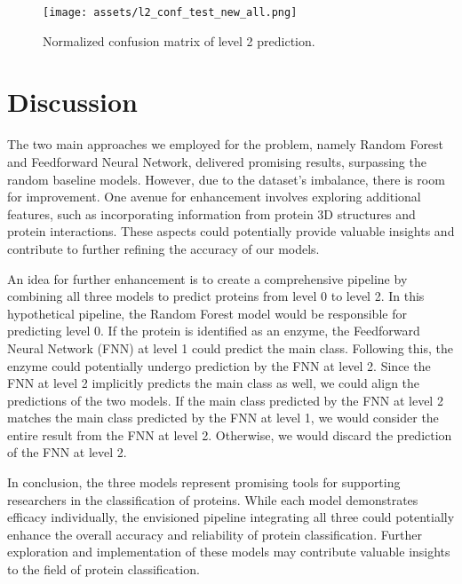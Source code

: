 \documentclass{bioinfo}
\begin{document}

\begin{figure}[!t]
\texttt{[image: assets/l2\_conf\_test\_new\_all.png]}
\caption{Normalized confusion matrix of level 2 prediction.}\label{fig:FNN_conf_l2}
\end{figure}

\section{Discussion}
The two main approaches we employed for the problem, namely Random Forest and Feedforward Neural Network, delivered promising results, surpassing the random baseline models.
However, due to the dataset's imbalance, there is room for improvement.
One avenue for enhancement involves exploring additional features, such as incorporating information from protein 3D structures and protein interactions.
These aspects could potentially provide valuable insights and contribute to further refining the accuracy of our models.

An idea for further enhancement is to create a comprehensive pipeline by combining all three models to predict proteins from level 0 to level 2.
In this hypothetical pipeline, the Random Forest model would be responsible for predicting level 0.
If the protein is identified as an enzyme, the Feedforward Neural Network (FNN) at level 1 could predict the main class.
Following this, the enzyme could potentially undergo prediction by the FNN at level 2.
Since the FNN at level 2 implicitly predicts the main class as well, we could align the predictions of the two models.
If the main class predicted by the FNN at level 2 matches the main class predicted by the FNN at level 1, 
we would consider the entire result from the FNN at level 2.
Otherwise, we would discard the prediction of the FNN at level 2.

In conclusion, the three models represent promising tools for supporting researchers in the classification of proteins. 
While each model demonstrates efficacy individually, the envisioned pipeline integrating all three could potentially enhance the overall accuracy and reliability of protein classification.
Further exploration and implementation of these models may contribute valuable insights to the field of protein classification.
\end{document}
